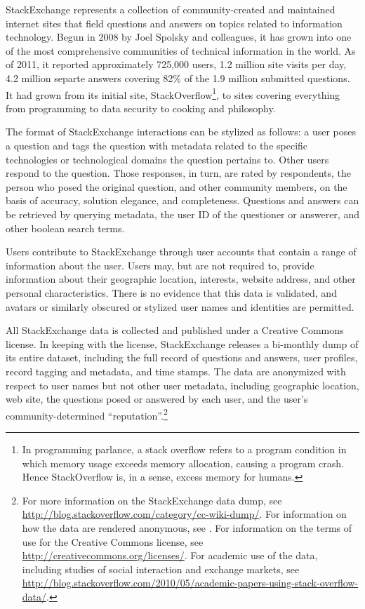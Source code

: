 \documentclass[11pt]{article}
\begin{document}
StackExchange represents a collection of community-created and
maintained internet sites that field questions and answers on topics related to information
technology. Begun in 2008 by Joel Spolsky and colleagues, it has grown
into one of the most comprehensive communities of technical
information in the world. As of 2011, it reported approximately
725,000 users, 1.2 million site visits per day, 4.2 million separte
answers covering 82\%  of the 1.9 million submitted questions. It had grown from its initial site,
StackOverflow\footnote{In programming parlance, a stack overflow
  refers to a program condition in which memory usage exceeds
  memory allocation, causing a program crash. Hence StackOverflow is,
  in a sense, excess memory for humans.}, to sites covering everything
from programming to data security to cooking and philosophy. 

The format of StackExchange interactions can be stylized as follows: a
user poses a question and tags the question with metadata related to
the specific technologies or technological domains the question
pertains to. Other users respond to the question. Those responses, in
turn, are rated by respondents, the person who posed the original
question, and other community members, on the basis of accuracy,
solution elegance, and completeness. Questions and answers can be
retrieved by querying metadata, the user ID of the questioner or
answerer, and other boolean search terms. 

Users contribute to StackExchange through user accounts that contain a
range of information about the user. Users may, but are not required
to, provide information about their geographic location, interests,
website address, and other personal characteristics. There is no
evidence that this data is validated, and avatars or similarly
obscured or stylized user names and identities are permitted. 


All StackExchange data is collected and published under a Creative
Commons license. In keeping with the license, StackExchange releases
a bi-monthly dump of its entire dataset, including the full record of
questions and answers, user profiles, record tagging and metadata, and
time stamps. The data are anonymized with respect to user names but
not other user metadata, including geographic location, web site,
the questions posed or answered by each user, and the
user's community-determined ``reputation''.\footnote{For more
  information on the StackExchange data dump, see \url{http://blog.stackoverflow.com/category/cc-wiki-dump/}. For information
  on how the data are rendered anonymous, see \url{}. For information
  on the terms of use for the Creative Commons license, see
  \url{http://creativecommons.org/licenses/}. For academic use of the
  data, including studies of social interaction and exchange markets,
  see \url{http://blog.stackoverflow.com/2010/05/academic-papers-using-stack-overflow-data/}.}
\end{document}
